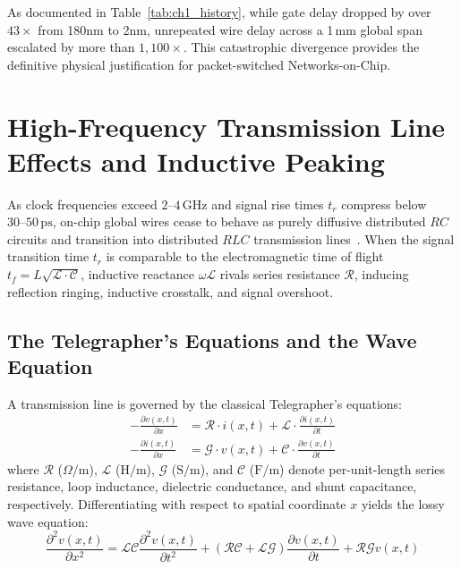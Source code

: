 As documented in Table~\ref{tab:ch1_history}, while gate delay dropped by over \textbf{$43\times$} from 180nm to 2nm, unrepeated wire delay across a 1\,mm global span escalated by more than \textbf{$1{,}100\times$}. This catastrophic divergence provides the definitive physical justification for packet-switched Networks-on-Chip.

\section{High-Frequency Transmission Line Effects and Inductive Peaking}
\label{sec:ch1_transmission_lines}

As clock frequencies exceed $2\text{--}4\,\mathrm{GHz}$ and signal rise times $t_r$ compress below $30\text{--}50\,\mathrm{ps}$, on-chip global wires cease to behave as purely diffusive distributed $RC$ circuits and transition into distributed $RLC$ transmission lines~\cite{DallyPoulton1998}. When the signal transition time $t_r$ is comparable to the electromagnetic time of flight $t_f = L \sqrt{\mathcal{L} \cdot \mathcal{C}}$, inductive reactance $\omega \mathcal{L}$ rivals series resistance $\mathcal{R}$, inducing reflection ringing, inductive crosstalk, and signal overshoot.

\subsection{The Telegrapher's Equations and the Wave Equation}
\label{subsec:ch1_telegraphers}

A transmission line is governed by the classical Telegrapher's equations:
\begin{align}
-\frac{\partial v(x, t)}{\partial x} &= \mathcal{R} \cdot i(x, t) + \mathcal{L} \cdot \frac{\partial i(x, t)}{\partial t} \label{eq:ch1_telegrapher_v} \\
-\frac{\partial i(x, t)}{\partial x} &= \mathcal{G} \cdot v(x, t) + \mathcal{C} \cdot \frac{\partial v(x, t)}{\partial t} \label{eq:ch1_telegrapher_i}
\end{align}
where $\mathcal{R}$ ($\Omega/\mathrm{m}$), $\mathcal{L}$ ($\mathrm{H/m}$), $\mathcal{G}$ ($\mathrm{S/m}$), and $\mathcal{C}$ ($\mathrm{F/m}$) denote per-unit-length series resistance, loop inductance, dielectric conductance, and shunt capacitance, respectively. Differentiating with respect to spatial coordinate $x$ yields the lossy wave equation:
\begin{equation}
\frac{\partial^2 v(x, t)}{\partial x^2} = \mathcal{L}\mathcal{C} \frac{\partial^2 v(x, t)}{\partial t^2} + (\mathcal{R}\mathcal{C} + \mathcal{L}\mathcal{G}) \frac{\partial v(x, t)}{\partial t} + \mathcal{R}\mathcal{G} v(x, t)
\label{eq:ch1_wave_equation}
\end{equation}

